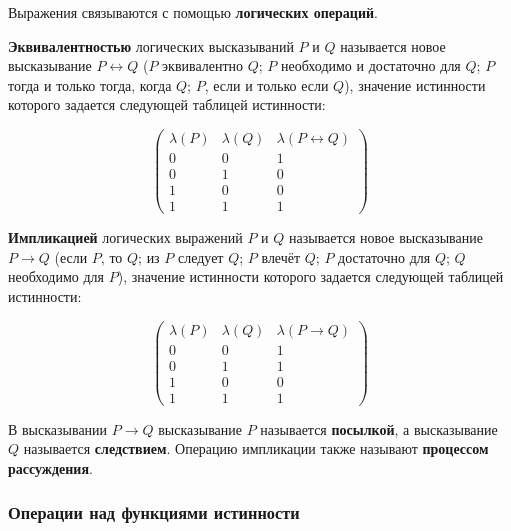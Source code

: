 \documentclass{article}
\begin{document}
Выражения связываются с помощью \textbf{логических операций}.

\textbf{Эквивалентностью} логических высказываний $P$ и $Q$ называется новое высказывание $P \leftrightarrow Q$ ($P$ эквивалентно $Q$; $P$ необходимо и достаточно для $Q$; $P$ тогда и только тогда, когда $Q$; $P$, если и только если $Q$), значение истинности которого задается следующей таблицей истинности:

$$
\begin{pmatrix}
    \lambda(P) & \lambda(Q) & \lambda(P \leftrightarrow Q) \\
    0 & 0 & 1 \\
    0 & 1 & 0 \\
    1 & 0 & 0 \\
    1 & 1 & 1
\end{pmatrix}
$$

\textbf{Импликацией} логических выражений $P$ и $Q$ называется новое высказывание $P \rightarrow Q$ (если $P$, то $Q$; из $P$ следует $Q$; $P$ влечёт $Q$; $P$ достаточно для $Q$; $Q$ необходимо для $P$), значение истинности которого задается следующей таблицей истинности:

$$
\begin{pmatrix}
    \lambda(P) & \lambda(Q) & \lambda(P \rightarrow Q) \\
    0 & 0 & 1 \\
    0 & 1 & 1 \\
    1 & 0 & 0 \\
    1 & 1 & 1
\end{pmatrix}
$$

В высказывании $P \rightarrow Q$ высказывание $P$ называется \textbf{посылкой}, а высказывание $Q$ называется \textbf{следствием}. Операцию импликации также называют \textbf{процессом рассуждения}.

\subsubsection{Операции над функциями истинности}
\end{document}
